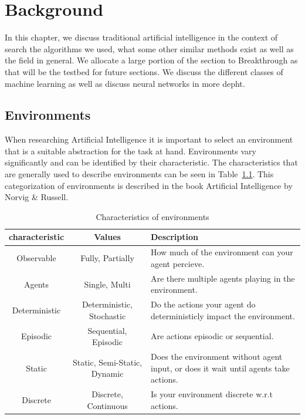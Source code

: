 \chapter{Background\label{cha:background}}

In this chapter, we discuss traditional artificial intelligence in the context of search the algorithms we used, what some other similar methods exist as well as the field in general. We allocate a large portion of the section to Breakthrough as that will be the testbed for future sections. We discuss the different classes of machine learning as well as discuss neural networks in more depht.

\section{Environments}
\label{sec:environments}

When researching Artificial Intelligence it is important to select an environment that is a suitable abstraction for the task at hand. Environments vary significantly and can be identified by their characteristic. The characteristics that are generally used to describe environments can be seen in Table~\ref{tab:env_characteristics}. This categorization of environments is described in the book Artificial Intelligence by Norvig \& Russell. \cite{Russell:AIModern}

\begin{table}[ht]
  \centering
  \begin{tabular}{|c|c|p{6cm}|}
    \hline
    \textbf{characteristic} & \textbf{Values}              & \textbf{Description}                                                                 \\
    \hline
    Observable              & Fully, Partially             & How much of the environment can your agent percieve.                                 \\
    \hline
    Agents                  & Single, Multi                & Are there multiple agents playing in the environment.                                \\
    \hline
    Deterministic           & Deterministic, Stochastic    & Do the actions your agent do deterministicly impact the environment.                 \\
    \hline
    Episodic                & Sequential, Episodic         & Are actions episodic or sequential.                                                  \\
    \hline
    Static                  & Static, Semi-Static, Dynamic & Does the environment without agent input, or does it wait until agents take actions. \\
    \hline
    Discrete                & Discrete, Continuous         & Is your environment discrete w.r.t actions.                                          \\
    \hline
  \end{tabular}
  \caption{Characteristics of environments}
  \label{tab:env_characteristics}
\end{table}

